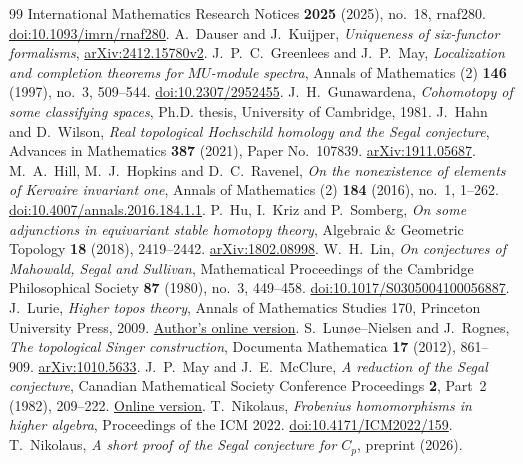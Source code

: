 \documentclass[11pt,a4paper]{article}
\theoremstyle{definition}
\begin{document}
\begin{thebibliography}{99}
International Mathematics Research Notices \textbf{2025} (2025), no.~18, rnaf280.
\href{https://doi.org/10.1093/imrn/rnaf280}{doi:10.1093/imrn/rnaf280}.
 A.~Dauser and J.~Kuijper,
\emph{Uniqueness of six-functor formalisms},
\href{https://arxiv.org/abs/2412.15780v2}{arXiv:2412.15780v2}.
 J.~P.~C.~Greenlees and J.~P.~May,
\emph{Localization and completion theorems for $MU$-module spectra},
Annals of Mathematics (2) \textbf{146} (1997), no.~3, 509--544.
\href{https://doi.org/10.2307/2952455}{doi:10.2307/2952455}.
 J.~H.~Gunawardena,
\emph{Cohomotopy of some classifying spaces},
Ph.D. thesis, University of Cambridge, 1981.
 J.~Hahn and D.~Wilson,
\emph{Real topological Hochschild homology and the Segal conjecture},
Advances in Mathematics \textbf{387} (2021), Paper No.~107839.
\href{https://arxiv.org/abs/1911.05687}{arXiv:1911.05687}.
 M.~A.~Hill, M.~J.~Hopkins and D.~C.~Ravenel,
\emph{On the nonexistence of elements of Kervaire invariant one},
Annals of Mathematics (2) \textbf{184} (2016), no.~1, 1--262.
\href{https://doi.org/10.4007/annals.2016.184.1.1}{doi:10.4007/annals.2016.184.1.1}.
 P.~Hu, I.~Kriz and P.~Somberg,
\emph{On some adjunctions in equivariant stable homotopy theory},
Algebraic \& Geometric Topology \textbf{18} (2018), 2419--2442.
\href{https://arxiv.org/abs/1802.08998}{arXiv:1802.08998}.
 W.~H.~Lin,
\emph{On conjectures of Mahowald, Segal and Sullivan},
Mathematical Proceedings of the Cambridge Philosophical Society \textbf{87} (1980), no.~3, 449--458.
\href{https://doi.org/10.1017/S0305004100056887}{doi:10.1017/S0305004100056887}.
 J.~Lurie, \emph{Higher topos theory},
Annals of Mathematics Studies 170, Princeton University Press, 2009.
\href{https://www.math.ias.edu/~lurie/papers/HTT.pdf}{Author's online version}.
 S.~Lun\o e--Nielsen and J.~Rognes,
\emph{The topological Singer construction},
Documenta Mathematica \textbf{17} (2012), 861--909.
\href{https://arxiv.org/abs/1010.5633}{arXiv:1010.5633}.
 J.~P.~May and J.~E.~McClure,
\emph{A reduction of the Segal conjecture},
Canadian Mathematical Society Conference Proceedings \textbf{2}, Part~2 (1982), 209--222.
\href{https://www.sas.rochester.edu/mth/sites/doug-ravenel/otherpapers/May-McClure-ocr.pdf}{Online version}.
 T.~Nikolaus,
\emph{Frobenius homomorphisms in higher algebra},
Proceedings of the ICM 2022.
\href{https://ems.press/books/standalone/276/5493}{doi:10.4171/ICM2022/159}.
 T.~Nikolaus,
\emph{A short proof of the Segal conjecture for $C_p$}, preprint (2026).

\end{thebibliography}
\end{document}
